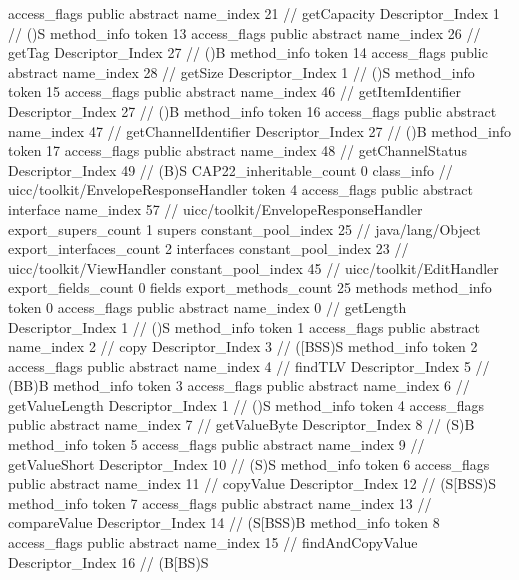 {{{{{					access_flags	public abstract
					name_index	21		// getCapacity
					Descriptor_Index	1		// ()S
				}
				method_info {
					token	13
					access_flags	public abstract
					name_index	26		// getTag
					Descriptor_Index	27		// ()B
				}
				method_info {
					token	14
					access_flags	public abstract
					name_index	28		// getSize
					Descriptor_Index	1		// ()S
				}
				method_info {
					token	15
					access_flags	public abstract
					name_index	46		// getItemIdentifier
					Descriptor_Index	27		// ()B
				}
				method_info {
					token	16
					access_flags	public abstract
					name_index	47		// getChannelIdentifier
					Descriptor_Index	27		// ()B
				}
				method_info {
					token	17
					access_flags	public abstract
					name_index	48		// getChannelStatus
					Descriptor_Index	49		// (B)S
				}
			}
			CAP22_inheritable_count	0
		}
		class_info {		// uicc/toolkit/EnvelopeResponseHandler
			token	4
			access_flags	public abstract interface
			name_index	57		// uicc/toolkit/EnvelopeResponseHandler
			export_supers_count	1
			supers {
				constant_pool_index	25		// java/lang/Object
			}
			export_interfaces_count	2
			interfaces {
				constant_pool_index	23		// uicc/toolkit/ViewHandler
				constant_pool_index	45		// uicc/toolkit/EditHandler
			}
			export_fields_count	0
			fields {
			}
			export_methods_count	25
			methods {
				method_info {
					token	0
					access_flags	public abstract
					name_index	0		// getLength
					Descriptor_Index	1		// ()S
				}
				method_info {
					token	1
					access_flags	public abstract
					name_index	2		// copy
					Descriptor_Index	3		// ([BSS)S
				}
				method_info {
					token	2
					access_flags	public abstract
					name_index	4		// findTLV
					Descriptor_Index	5		// (BB)B
				}
				method_info {
					token	3
					access_flags	public abstract
					name_index	6		// getValueLength
					Descriptor_Index	1		// ()S
				}
				method_info {
					token	4
					access_flags	public abstract
					name_index	7		// getValueByte
					Descriptor_Index	8		// (S)B
				}
				method_info {
					token	5
					access_flags	public abstract
					name_index	9		// getValueShort
					Descriptor_Index	10		// (S)S
				}
				method_info {
					token	6
					access_flags	public abstract
					name_index	11		// copyValue
					Descriptor_Index	12		// (S[BSS)S
				}
				method_info {
					token	7
					access_flags	public abstract
					name_index	13		// compareValue
					Descriptor_Index	14		// (S[BSS)B
				}
				method_info {
					token	8
					access_flags	public abstract
					name_index	15		// findAndCopyValue
					Descriptor_Index	16		// (B[BS)S
}}}}}
